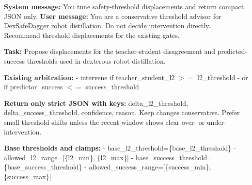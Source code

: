 \begin{algorithm}[H]
\makeatletter
\renewcommand{\fnum@algorithm}{}
\makeatother
\caption{\textcolor{black}{\textbf{VLM Prompt Example}}}
{\color{black}\scriptsize\ttfamily\renewcommand{\baselinestretch}{0.98}\selectfont
\newcommand{\jkey}[1]{\textbf{"#1"}}
\begin{minipage}[t]{0.485\linewidth}
\begin{algorithmic}
\setlength{\itemsep}{0pt}
\STATE \textbf{System message:}
\STATE You tune safety-threshold displacements and return compact JSON only.
\STATE \textbf{User message:}
\STATE You are a conservative threshold advisor for DexSafeDagger robot
distillation.
\STATE Do not decide intervention directly. Recommend threshold displacements for the
existing gates.

\STATE \textbf{Task:} Propose displacements for the teacher-student disagreement and
predicted-success thresholds used in dexterous robot distillation.

\STATE \textbf{Existing arbitration:}
\STATE - intervene if teacher\_student\_l2 $\mathord{>=}$ l2\_threshold
\STATE - or if predictor\_success $\mathord{<=}$ success\_threshold

\STATE \textbf{Return only strict JSON with keys:} delta\_l2\_threshold, delta\_success\_threshold,
confidence, reason.
\STATE Keep changes conservative. Prefer small threshold shifts unless the
recent window shows clear over- or under-intervention.

\STATE \textbf{Base thresholds and clamps:}
\STATE - base\_l2\_threshold=\{base\_l2\_threshold\}
\STATE - allowed\_l2\_range=[\{l2\_min\}, \{l2\_max\}]
\STATE - base\_success\_threshold=\{base\_success\_threshold\}
\STATE - allowed\_success\_range=[\{success\_min\}, \{success\_max\}]


\end{algorithmic}
\end{minipage}}
\end{algorithm}
